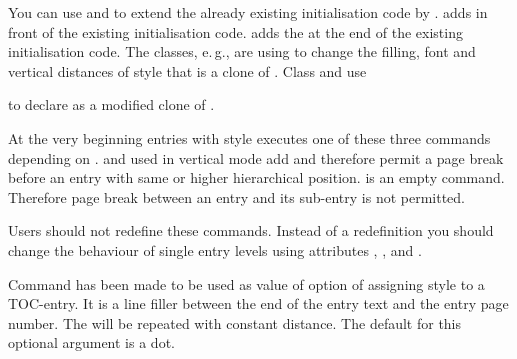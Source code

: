 You can use  and
 to extend the already existing initialisation
code by .  adds
 in front of the existing initialisation
code.  adds the  at the end
of the existing initialisation code. The \KOMAScript{} classes, e.\,g., are
using  to change the filling, font and
vertical distances of style  that is a clone of
. Class  and  use
\begin{lstcode}
  \TOCEntryStyleStartInitCode{section}{%
    \expandafter\providecommand%
    \csname scr@tso@#1@linefill\endcsname
    {\TOCLineLeaderFill\relax}%
  }
\end{lstcode}
to declare  as a modified clone of .%
\EndIndexGroup


\begin{Declaration}
\end{Declaration}
At the very beginning entries
with style   executes one of these three
commands depending on .  and
 used in vertical mode add
 and therefore permit a
page break before an entry with same or higher hierarchical
position.  is an empty command. Therefore page
break between an entry and its sub-entry is not permitted.

Users should not redefine these commands. Instead of a redefinition you should
change the behaviour of single entry levels using attributes
, , and
.%
\EndIndexGroup


\begin{Declaration}
\end{Declaration}
Command has been made to be used
as value of option  of assigning style  to a
TOC-entry. It is a line filler between the end of the entry text and the entry
page number. The  will be repeated with constant
distance. The default for this optional argument is a dot.

